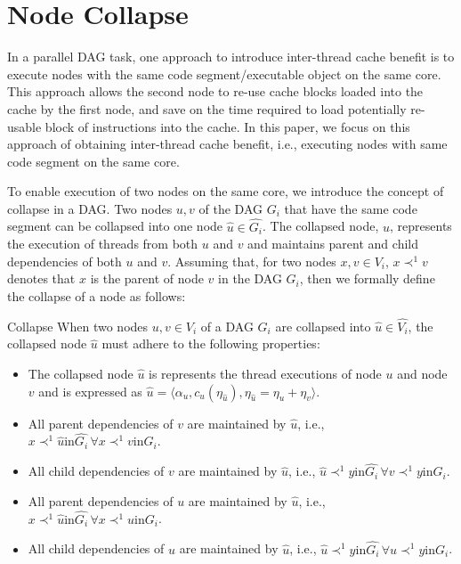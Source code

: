 \section{Node Collapse}
In a parallel DAG task, one approach to introduce inter-thread cache benefit is to execute nodes with the same code segment/executable object on the same core. This approach allows the second node to re-use cache blocks loaded into the cache by the first node, and save on the time required to load potentially re-usable block of instructions into the cache. In this paper, we focus on this approach of obtaining inter-thread cache benefit, i.e., executing nodes with same code segment on the same core.  

To enable execution of two nodes on the same core, we introduce the concept of collapse in a DAG. Two nodes $u, v$ of the DAG $G_i$ that have the same code segment can be collapsed into one node $\hat{u} \in \hat{G_i}$. The collapsed node, $\hat{u}$, represents the execution of threads from both $u$ and $v$ and maintains parent and child dependencies of both $u$ and $v$. Assuming that, for two nodes $x, v \in V_i$, $x \prec^{1} v$ denotes that $x$ is the parent of node $v$ in the DAG $G_i$, then we formally define the collapse of a node as follows:
 \begin{definition}{\texbf Collapse}
When two nodes $u,v \in V_i$ of a DAG $G_i$ are collapsed into $\hat{u} \in \hat{V_i}$, the collapsed node $\hat{u}$ must adhere to the following properties:
\begin{itemize}
\item The collapsed node $\hat{u}$ is represents the thread executions of node $u$ and node $v$ and is expressed as $\hat{u} = \langle \alpha_u , c_u(\eta_{\hat{u}}), \eta_{\hat{u}} = \eta_u+\eta_v \rangle$.
\item All parent dependencies of $v$ are maintained by $\hat{u}$, i.e., $ x \prec^{1} \hat{u} \text{in} \hat{G_i} \, \forall x \prec^1 v \text{in} G_i$.
\item All child dependencies of $v$ are maintained by $\hat{u}$, i.e., $\hat{u} \prec^{1} y \text{in} \hat{G_i} \, \forall v \prec^1 y \text{in} G_i$.
\item All parent dependencies of $u$ are maintained by $\hat{u}$, i.e., $ x \prec^{1} \hat{u} \text{in} \hat{G_i} \, \forall x \prec^1 u \text{in} G_i$.
\item All child dependencies of $u$ are maintained by $\hat{u}$, i.e., $\hat{u} \prec^{1} y \text{in} \hat{G_i} \, \forall u \prec^1 y \text{in} G_i$.
\end{itemize}
 \end{definition}

